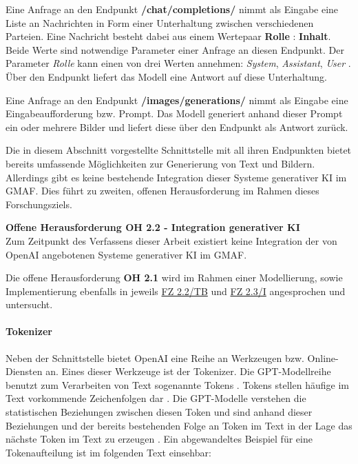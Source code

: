 Eine Anfrage an den Endpunkt \textbf{/chat/completions/} nimmt als Eingabe eine Liste an Nachrichten in Form einer Unterhaltung zwischen verschiedenen Parteien.
Eine Nachricht besteht dabei aus einem Wertepaar \textbf{Rolle} : \textbf{Inhalt}.
Beide Werte sind notwendige Parameter einer Anfrage an diesen Endpunkt.
Der Parameter \textit{Rolle} kann einen von drei Werten annehmen: \textit{System}, \textit{Assistant}, \textit{User} \cite{openai-chat-compl-roles}.
Über den Endpunkt liefert das Modell eine Antwort auf diese Unterhaltung.

Eine Anfrage an den Endpunkt \textbf{/images/generations/} nimmt als Eingabe eine Eingabeaufforderung bzw. Prompt.
Das Modell generiert anhand dieser Prompt ein oder mehrere Bilder und liefert diese über den Endpunkt als Antwort zurück.

Die in diesem Abschnitt vorgestellte Schnittstelle mit all ihren Endpunkten bietet bereits umfassende Möglichkeiten zur Generierung von Text und Bildern.
Allerdings gibt es keine bestehende Integration dieser Systeme generativer KI im GMAF.
Dies führt zu zweiten, offenen Herausforderung im Rahmen dieses Forschungsziels.
\begin{tcolorbox}[minipage, colback=white, colframe=black, arc=0pt, outer arc=0pt]
    \textbf{Offene Herausforderung OH 2.2 - Integration generativer KI} \\
    Zum Zeitpunkt des Verfassens dieser Arbeit existiert keine Integration der von OpenAI angebotenen Systeme generativer KI im GMAF.
\end{tcolorbox}
Die offene Herausforderung \textbf{OH 2.1} wird im Rahmen einer Modellierung, sowie Implementierung ebenfalls in jeweils \hyperref[sec3:model:subsec:fz-integration]{FZ 2.2/TB} und \hyperref[sec4:impl:subsec:fz-integration]{FZ 2.3/I} angesprochen und untersucht.

\paragraph{Tokenizer}
\label{sec2:sota:par:tokenizer}
Neben der Schnittstelle bietet OpenAI eine Reihe an Werkzeugen bzw. Online-Diensten an.
Eines dieser Werkzeuge ist der Tokenizer.
Die GPT-Modellreihe benutzt zum Verarbeiten von Text sogenannte Tokens \cite{openai-tokenizer}.
Tokens stellen häufige im Text vorkommende Zeichenfolgen dar \cite{openai-tokenizer}.
Die GPT-Modelle verstehen die statistischen Beziehungen zwischen diesen Token und sind anhand dieser Beziehungen und der bereits bestehenden Folge an Token im Text in der Lage das nächste Token im Text zu erzeugen \cite{openai-tokenizer}.
Ein abgewandeltes Beispiel für eine Tokenaufteilung ist im folgenden Text einsehbar:

